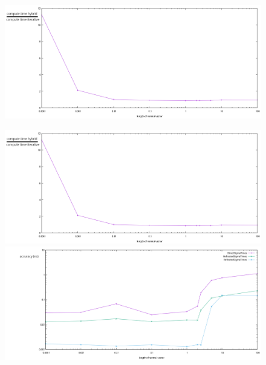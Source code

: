 \documentclass{beamer}
\begin{document}
\begin{frame}
	\begin{figure}
		\includegraphics[width=\textwidth]{figures/NormVsTime.pdf}
	\end{figure}
\end{frame}
\begin{frame}
	\begin{figure}
		\begin{minipage}{\textwidth}
    \centering
			\includegraphics[height=0.45\textheight]{figures/NormVsTime.pdf}
		\end{minipage}
		\begin{minipage}{\textwidth}
			\centering
			\includegraphics[height=0.45\textheight]{figures/NormVsSigmaTime.pdf}
		\end{minipage}
	\end{figure}
\end{frame}
\end{document}
